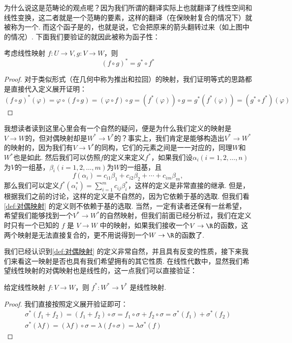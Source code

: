 为什么说这是范畴论的观点呢？因为我们所谓的翻译实际上也就翻译了线性空间和线性变换，这二者就是一个范畴的要素，这样的翻译（在保映射复合的情况下）就被称为一个. 而这个函子是的，也就是说，它会把原来的箭头翻转过来（如上图中的情况）. 下面我们要验证的就因此被称为函子性：

\begin{lemma}{}{}
    考虑线性映射 $f\colon U \to V, g: V \to W$，则
    \[
        (f \circ g)^* = g^* \circ f^*
    \]
\end{lemma}

\begin{proof}
    对于类似形式（在几何中称为推出和拉回）的映射，我们证明等式的思路都是直接代入定义展开证明：
    \[
        (f \circ g)^* (\varphi) = \varphi \circ (f \circ g) = (\varphi \circ f) \circ g = (f^*(\varphi)) \circ g = g^* (f^*(\varphi)) = (g^* \circ f^*)(\varphi)
    \]
\end{proof}

我想读者读到这里心里会有一个自然的疑问，便是为什么我们定义的映射是$V\to W$的，但对偶映射却是$W^*\to V^*$的？事实上，我们肯定是能够构造出$V^*\to W^*$的映射的，因为我们有$V\to V^*$的同构，它们的元素之间是一一对应的，同理$W$和$W^*$也是如此. 然后我们可以仿照$f$的定义来定义$f^*$，如果我们设$\alpha_i(i=1,2,\ldots,n)$为$V$的一组基，$\beta_i(i=1,2,\ldots,m)$为$W$的一组基，且
\[f(\alpha_i)=c_{i1}\beta_1+c_{i2}\beta_2+\cdots+c_{im}\beta_m,\]
那么我们可以定义$f^*(\alpha_i^*)=\sum\limits_{i=1}^m c_{ij}\beta_i^*$，这样的定义是非常直接的继承. 但是，根据我们之前的讨论，这样的定义是不自然的，因为它依赖于基的选取. 但我们看\autoref{def:对偶映射} 的定义则不依赖于基的选取. 当然，一定有读者还保有一丝希望，希望我们能够找到一个$V^*\to W^*$的自然映射，但我们前面已经分析过，我们在定义时只有一个已知的 $f$ 是 $V\to W$ 中的映射，如果我们接收一个$V\to \R$的函数，这两个映射是无法直接复合的，更不用说得到一个$W\to \R$的函数了.

我们已经认识到\autoref{def:对偶映射} 的定义非常自然，并且具有反变的性质，接下来我们来看这一映射是否也具有我们希望拥有的其它性质. 在线性代数中，显然我们希望线性映射的对偶映射也是线性的，这一点我们可以直接验证：
\begin{lemma}{}{}
    给定线性映射 $f\colon V \to W$，则 $f^*: W^* \to V^*$ 是线性映射.
\end{lemma}
\begin{proof}
    我们直接按照定义展开验证即可：
    \begin{gather*}
        \sigma^*(f_1+f_2)=(f_1+f_2)\circ\sigma=f_1\circ\sigma+f_2\circ\sigma=\sigma^*(f_1)+\sigma^*(f_2) \\
        \sigma^*(\lambda f)=(\lambda f)\circ\sigma=\lambda(f\circ\sigma)=\lambda\sigma^*(f)
    \end{gather*}
\end{proof}

